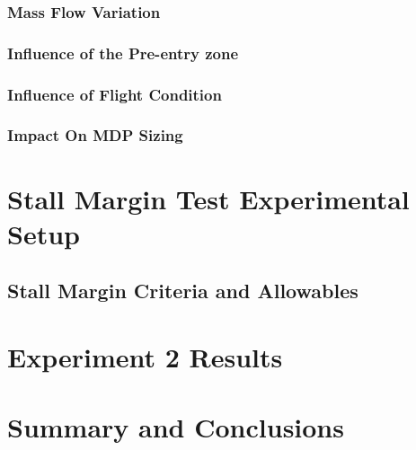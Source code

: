 	\subsubsection{Mass Flow Variation}
	
	\subsubsection{Influence of the Pre-entry zone}
	
	\subsubsection{Influence of Flight Condition}
	
	\subsubsection{Impact On MDP Sizing}
	
	\section{Stall Margin Test Experimental Setup}
	
	\subsection{Stall Margin Criteria and Allowables}
	
	\section{Experiment 2 Results}
	
	\section{Summary and Conclusions}